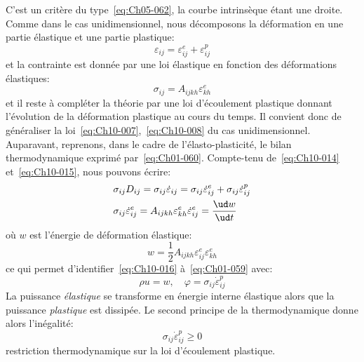 C'est un critère du type~\eqref{eq:Ch05-062}, la courbe intrinsèque étant une droite. 
Comme dans le cas unidimensionnel, nous décomposons la déformation 
en une partie élastique et une partie plastique: 
\begin{equation}
    \varepsilon_{ij} = \varepsilon_{ij}^e + \varepsilon_{ij}^p
    \label{eq:Ch10-014}
\end{equation}
et la contrainte est donnée par une loi élastique en fonction des déformations élastiques: 
\begin{equation}
    \sigma_{ij} = A_{ijkh} \varepsilon_{kh}^e
    \label{eq:Ch10-015}
\end{equation}
et il reste à compléter la théorie par une loi d'écoulement plastique donnant l'évolution de la déformation plastique au cours du temps.
Il convient donc de généraliser la loi~\eqref{eq:Ch10-007},~\eqref{eq:Ch10-008} du cas unidimensionnel.
Auparavant, reprenons, dans le cadre de l'élasto-plasticité, le bilan thermodynamique exprimé par~\eqref{eq:Ch01-060}.
Compte-tenu de~\eqref{eq:Ch10-014} et~\eqref{eq:Ch10-015}, nous pouvons écrire: 
\begin{equation}
    \begin{aligned}
        & \sigma_{ij} D_{ij} = \sigma_{ij} \dot{\varepsilon}_{ij} = \sigma_{ij} \dot{\varepsilon}_{ij}^e + \sigma_{ij} \dot{\varepsilon}_{ij}^p \\
        & \sigma_{ij} \dot{\varepsilon}_{ij}^e = A_{ijkh} \varepsilon_{kh}^e \dot{\varepsilon}_{ij}^e = \frac{\ud w}{\ud t}
    \end{aligned}
    \label{eq:Ch10-016}
\end{equation}
où $w$ est l'énergie de déformation élastique:
\begin{equation}
    w = \frac{1}{2} A_{ijkh} \varepsilon_{ij}^e \varepsilon_{kh}^e
    \label{eq:Ch10-017}
\end{equation}
ce qui permet d'identifier~\eqref{eq:Ch10-016} à~\eqref{eq:Ch01-059} avec: 
\begin{equation}
    \rho u = w ,\quad \varphi = \sigma_{ij} \dot{\varepsilon}_{ij}^p
    \label{eq:Ch10-018}
\end{equation}
La puissance \emph{élastique} se transforme en énergie interne élastique alors que la puissance \emph{plastique} est dissipée.
Le second principe de la thermodynamique donne alors l'inégalité: 
\begin{equation}
    \sigma_{ij} \dot{\varepsilon}_{ij}^p \geq 0
    \label{eq:Ch10-018}
\end{equation}
restriction thermodynamique sur la loi d'écoulement plastique. 

